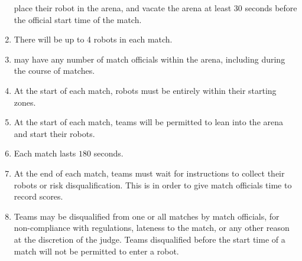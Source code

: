 \begin{enumerate}
        place their robot in the arena, and vacate the arena at least 30 seconds
        before the official start time of the match.
  \item There will be up to 4 robots in each match.
  \item \org may have any number of match officials within the arena, including
        during the course of matches.
  \item At the start of each match, robots must be entirely within their
        starting zones.
  \item At the start of each match, teams will be permitted to lean into the
        arena and start their robots.
  \item Each match lasts $180$ seconds.
  \item At the end of each match, teams must wait for instructions to collect
        their robots or risk disqualification. This is in order to give match
        officials time to record scores.
  \item Teams may be disqualified from one or all matches by match officials,
        for non-compliance with regulations, lateness to the match, or any other
        reason at the discretion of the judge. Teams disqualified before the
        start time of a match will not be permitted to enter a robot.
\end{enumerate}

